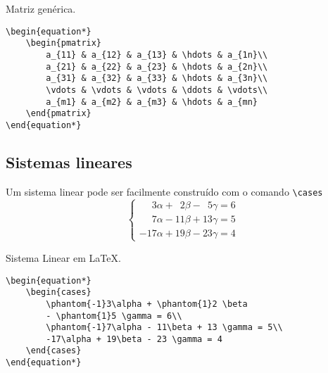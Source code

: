 \begin{programcode}{Matriz genérica.}
\vspace{-0.5 cm}
\begin{verbatim}
\begin{equation*}
    \begin{pmatrix}
        a_{11} & a_{12} & a_{13} & \hdots & a_{1n}\\
        a_{21} & a_{22} & a_{23} & \hdots & a_{2n}\\
        a_{31} & a_{32} & a_{33} & \hdots & a_{3n}\\
        \vdots & \vdots & \vdots & \ddots & \vdots\\
        a_{m1} & a_{m2} & a_{m3} & \hdots & a_{mn}
    \end{pmatrix}
\end{equation*}
\end{verbatim}
\end{programcode}

\subsection{Sistemas lineares}
Um sistema linear pode ser facilmente constru\'{i}do com o comando \verb|\cases|
\begin{equation*}
    \begin{cases}
        \phantom{-1}3\alpha + \phantom{1}2\beta - \phantom{1}5 \gamma = 6\\
        \phantom{-1}7\alpha - 11\beta + 13 \gamma = 5\\
        -17\alpha + 19\beta - 23 \gamma = 4
    \end{cases}
\end{equation*}


\begin{programcode}{Sistema Linear em \LaTeX.}
\begin{verbatim}
\begin{equation*}
    \begin{cases}
        \phantom{-1}3\alpha + \phantom{1}2 \beta 
        - \phantom{1}5 \gamma = 6\\
        \phantom{-1}7\alpha - 11\beta + 13 \gamma = 5\\
        -17\alpha + 19\beta - 23 \gamma = 4
    \end{cases}
\end{equation*}
\end{verbatim}
\end{programcode}

\newpage

